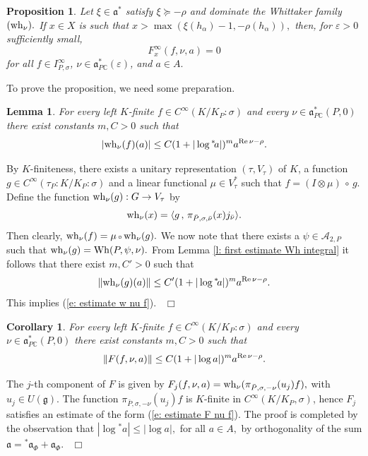 \documentclass[12pt,a4paper]{article}
\newtheorem{Cor}[Thm]{Corollary}
\newtheorem{Lemma}[Thm]{Lemma}
\newtheorem{Prop}[Thm]{Proposition}
\newenvironment{cor}[0]{\begin{Cor}\noindent}%
{\end{Cor}}
\newenvironment{lemma}[0]{\begin{Lemma}\noindent}%
{\end{Lemma}}
\newenvironment{prop}[0]{\begin{Prop}\noindent}%
{\end{Prop}}
\def\proof{\par\noindent{\it Proof.}{\ }{\ }}
\def\qed{~\hfill\hbox{$\Box$}\medbreak}
\def\msy#1{{\mathbb #1}}
\def\C{{\msy C}}
\def\ga{\alpha}
\def\ge{\varepsilon}
\def\gs{\sigma}
\def\got#1{\mathfrak #1}
\def\fa{{\got a}}
\def\fg{{\got g}}
\def\to{\rightarrow}
\def\Re{{\rm Re}\,}
\def\inp#1#2{\langle#1\,,\,#2\rangle}
\def\after{\,{\scriptstyle\circ}\,}
\def\iC{{\scriptscriptstyle \C}}
\def\cA{{\mathcal A}}
\numberwithin{Thm}{section}
\numberwithin{equation}{section}
\def\Wh{{\rm Wh}}
\def\faPdc{{\fa_{P\iC}^*}}
\numberwithin{equation}{section}
\def\fad{{\fa^*}}
\def\faPdc{\fa_{P\iC}^*}
\def\IPgs{I_{P,\gs}^\infty}
\def\cAtwoP{\cA_{2,P}}
\def\wh{{\rm wh}}
\def\xx{x}
\def\xxi{\xi}
\def\gsP{\gs}%
\begin{document}
\begin{prop}
\label{p: vanishing F xi infty}
Let $\xxi \in \fad$ satisfy $\xxi \succeq -\rho$ and dominate the Whittaker family $(\wh_\nu).$ 
If  $\xx \in X$ is such that $\xx > \max(\xxi(h_\ga) - 1, -\rho(h_\ga)),$  then, for $\ge>0$ sufficiently small,
$$ 
F^\infty_\xx(f, \nu , a) = 0
$$ 
for all $f \in \IPgs$, $  \nu \in \faPdc(\ge)$, and $a \in A.$  
\end{prop}
To prove the proposition, we need some preparation.
\begin{lemma}
For every left $K$-finite $f \in C^\infty(K/K_P: \gsP)$ and every $\nu \in \faPdc(P,0)$ 
there exist constants $m, C >0$ such that
\begin{equation}
\label{e: estimate w nu f}
|\wh_\nu(f)(a) | \leq C (1 + |\log {}^*\!a|)^m  a^{\Re \nu - \rho}.
\end{equation}  
\end{lemma}
\proof
By $K$-finiteness, there exists a unitary representation $(\tau, V_\tau)$  of $K$, 
a function $g \in C^\infty(\tau_P: K/K_P: \gsP)$ and a linear functional $\mu \in V_\tau^*$ 
such that $f = (I \otimes \mu)\after g.$ Define the function 
$\wh_\nu(g): G \to V_\tau$ by 
$$
\wh_\nu(x) = \inp{g}{\pi_{\bar P, \gs, \bar \nu} (x) j_{\bar \nu}}.
$$%
Then clearly, $\wh_\nu(f )= \mu \after \wh_\nu(g).$ We now note that there exists
a $\psi \in \cAtwoP$ such that $\wh_\nu(g) = \Wh(P,\psi, \nu).$ From Lemma \ref{l: first estimate Wh integral} it follows
that there exist $m, C' >0$ such that
$$  
\|\wh_\nu(g)(a) \| \leq C' (1 +| \log {}^*\!a|)^m a^{\Re \nu - \rho}.
$$%
\noindent%
This implies (\ref{e: estimate w nu f}).
\qed

\begin{cor}
\label{c: estimate F for K-finite f}
For every left $K$-finite $f \in C^\infty(K/K_P: \gsP)$ and every $\nu \in \faPdc(P,0)$ 
there exist constants $m, C >0$ such that
\begin{equation}
\label{e: estimate F nu f}
\|F(f, \nu, a)\| \leq C (1 + |\log a|)^m  a^{\Re \nu - \rho}.
\end{equation}  
\end{cor}

\proof 
The $j$-th component of $F$ is given by 
$
F_j(f, \nu , a) = \wh_\nu( \pi_{\bar P, \gs, -\nu}(u_j) f),
$
with $u_j \in U(\fg).$ The function $\pi_{\bar P, \gs,  -\nu}(u_j) f$ 
is $K$-finite in $C^\infty(K/K_P, \gsP)$, hence $F_j$ satisfies an estimate
of the form (\ref{e: estimate F nu f}). The proof is completed by the observation
that $|\log {}^*\!a|\leq |\log a|,$ for all $a \in A,$ by orthogonality of the sum
$\fa = {}^*\!\fa_\Phi + \fa_\Phi.$ 
\qed
\end{document}
